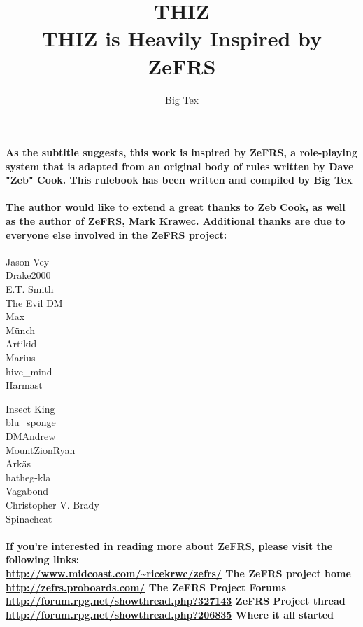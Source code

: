 \documentclass[oneside]{book}
\begin{document}
\frontmatter

\title{ {\Huge THIZ} \\ \vspace{2 mm} {\large THIZ is Heavily Inspired by ZeFRS}}
\date{}
\author{Big Tex}
\maketitle

\paragraph{As the subtitle suggests, this work is inspired by ZeFRS, a role-playing system that is adapted from an original body of rules written by Dave "Zeb" Cook. This rulebook has been written and compiled by Big Tex} 

\paragraph{The author would like to extend a great thanks to Zeb Cook, as well as the author of ZeFRS, Mark Krawec. Additional thanks are due to everyone else involved in the ZeFRS project: \\}

\begin{minipage}[t]{0.5\textwidth}
Jason Vey \\
Drake2000 \\ 
E.T. Smith \\
The Evil DM \\
Max \\
M\"{u}nch \\
Artikid \\
Marius \\
hive\_mind \\
Harmast
\end{minipage}
\begin{minipage}[t]{0.5\textwidth}
Insect King \\
blu\_sponge \\
DMAndrew \\
MountZionRyan \\
\"{A}rk\"{a}s \\
hatheg-kla \\
Vagabond \\
Christopher V. Brady \\
Spinachcat
\end{minipage}

\paragraph{If you're interested in reading more about ZeFRS, please visit the following links: \\
\url{http://www.midcoast.com/~ricekrwc/zefrs/} The ZeFRS project home\\
\url{http://zefrs.proboards.com/} The ZeFRS Project Forums \\
\url{http://forum.rpg.net/showthread.php?327143} ZeFRS Project thread \\
\url{http://forum.rpg.net/showthread.php?206835} Where it all started }
\end{document}
